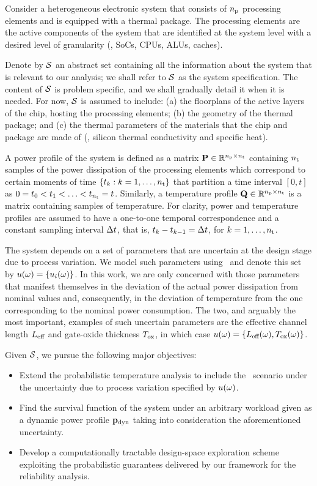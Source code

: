 Consider a heterogeneous electronic system that consists of ${n_\text{p}}$ processing elements and is equipped with a thermal package.
The processing elements are the active components of the system that are identified at the system level with a desired level of granularity (\eg, SoCs, CPUs, ALUs, caches).

Denote by $\mathcal{S}$ an abstract set containing all the information about the system that is relevant to our analysis; we shall refer to $\mathcal{S}$ as the system specification.
The content of $\mathcal{S}$ is problem specific, and we shall gradually detail it when it is needed.
For now, $\mathcal{S}$ is assumed to include: (a) the floorplans of the active layers of the chip, hosting the processing elements; (b) the geometry of the thermal package; and (c) the thermal parameters of the materials that the chip and package are made of (\eg, silicon thermal conductivity and specific heat).

A power profile of the system is defined as a matrix $\mathbf{P} \in \mathbb{R}^{{n_\text{p}} \times {n_\text{t}}}$ containing ${n_\text{t}}$ samples of the power dissipation of the processing elements which correspond to certain moments of time $\{ t_k: k = 1, \dots, {n_\text{t}} \}$ that partition a time interval $[0, t]$ as $0 = t_0 < t_1 < \dotsc < t_{n_\text{t}} = t$.
Similarly, a temperature profile $\mathbf{Q} \in \mathbb{R}^{{n_\text{p}} \times {n_\text{t}}}$ is a matrix containing samples of temperature.
For clarity, power and temperature profiles are assumed to have a one-to-one temporal correspondence and a constant sampling interval $\Delta t$, that is, $t_k - t_{k - 1} = \Delta t$, for $k = 1, \dots, {n_\text{t}}$.

The system depends on a set of parameters that are uncertain at the design stage due to process variation.
We model such parameters using \rvs\ and denote this set by $u(\omega) = \{ u_i(\omega) \}$.
In this work, we are only concerned with those parameters that manifest themselves in the deviation of the actual power dissipation from nominal values and, consequently, in the deviation of temperature from the one corresponding to the nominal power consumption.
The two, and arguably the most important, examples of such uncertain parameters are the effective channel length $L_\text{eff}$ and gate-oxide thickness $T_\text{ox}$, in which case $u(\omega) = \{ L_\text{eff}(\omega), T_\text{ox}(\omega) \}$.

Given $\mathcal{S}$, we pursue the following major objectives:
\begin{itemize}
  \item Extend the probabilistic temperature analysis to include the \dss\ scenario under the uncertainty due to process variation specified by $u(\omega)$.
  \item Find the survival function of the system under an arbitrary workload given as a dynamic power profile $\mathbf{p}_{\text{dyn}}$ taking into consideration the aforementioned uncertainty.
  \item Develop a computationally tractable design-space exploration scheme exploiting the probabilistic guarantees delivered by our framework for the reliability analysis.
\end{itemize}
